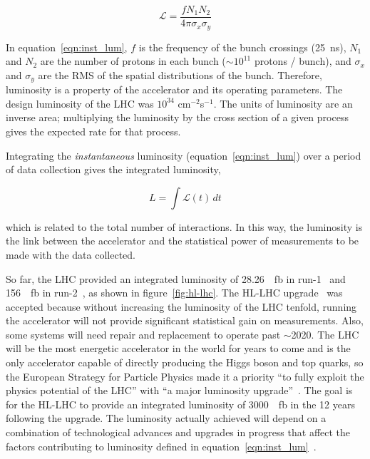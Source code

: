 \begin{equation}
\mathcal{L} = \frac{f N_{1} N_{2} }{4 \pi \sigma_{x} \sigma_{y}}
\label{eqn:inst_lum}
\end{equation}

In equation~\ref{eqn:inst_lum}, $f$ is the frequency of the bunch crossings (\SI{25}{\nano\second}), $N_{1}$ and $N_{2}$ are the number of protons in each bunch ($\sim 10^{11}$ protons / bunch), and $\sigma_{x}$ and $\sigma_{y}$ are the RMS of the spatial distributions of the bunch. Therefore, luminosity is a property of the accelerator and its operating parameters. The design luminosity of the LHC was $10^{34}$ cm$^{-2}$s$^{-1}$. The units of luminosity are an inverse area; multiplying the luminosity by the cross section of a given process gives the expected rate for that process.

Integrating the \textit{instantaneous} luminosity (equation~\ref{eqn:inst_lum}) over a period of data collection gives the integrated luminosity,

\begin{equation}
L = \int \mathcal{L} \left( t \right) \,dt
\label{eqn:int_lum}
\end{equation}

which is related to the total number of interactions. In this way, the luminosity is the link between the accelerator and the statistical power of measurements to be made with the data collected. 

So far, the LHC provided an integrated luminosity of \SI{28.26}{\per\femto\barn} in run-1~\cite{atlas_luminosity_run1} and \SI{156}{\per\femto\barn} in run-2~\cite{atlas_luminosity_run2}, as shown in figure~\ref{fig:hl-lhc}. The HL-LHC upgrade~\cite{hl_lhc_tdr} was accepted because without increasing the luminosity of the LHC tenfold, running the accelerator will not provide significant statistical gain on measurements. Also, some systems will need repair and replacement to operate past $\sim$2020. The LHC will be the most energetic accelerator in the world for years to come and is the only accelerator capable of directly producing the Higgs boson and top quarks, so the European Strategy for Particle Physics made it a priority ``to fully exploit the physics potential of the LHC'' with ``a major luminosity upgrade''~\cite{european_strategy_for_particle_physics}. The goal is for the HL-LHC to provide an integrated luminosity of \SI{3000}{\per\femto\barn} in the 12 years following the upgrade. The luminosity actually achieved will depend on a combination of technological advances and upgrades in progress that affect the factors contributing to luminosity defined in equation~\ref{eqn:inst_lum}~\cite{hl_lhc_tdr}.

